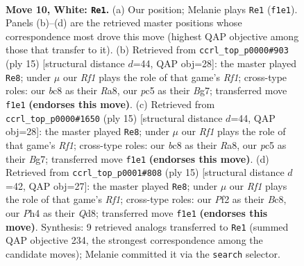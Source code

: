 \documentclass[11pt]{article}
\begin{document}
\clearpage

\begin{figure}[p]\centering
\begin{subfigure}{0.46\textwidth}\centering
\resizebox{\linewidth}{!}{%
\newchessgame
\chessboard[
  setfen={1rbq1rk1/pp1p1pbp/2n3p1/2p1p2n/2P4P/4PNP1/PP1P1PB1/RNBQ1RK1 w - - 0 10},
  showmover=false,
  pgfstyle=straightmove, color=movearrow, markmove={f1-e1}
]}
\caption{}
\end{subfigure}\hfill
\begin{subfigure}{0.46\textwidth}\centering
\resizebox{\linewidth}{!}{%
\newchessgame
\chessboard[
  setfen={rnbq1rk1/pp3pbp/3ppnp1/2pP4/2P5/2N2NP1/PP2PPBP/R1BQ1RK1 b - - 1 8},
  showmover=false,
  pgfstyle=straightmove, color=movearrow, markmove={f8-e8}
]}
\caption{}
\end{subfigure}
\\[4pt]
\begin{subfigure}{0.46\textwidth}\centering
\resizebox{\linewidth}{!}{%
\newchessgame
\chessboard[
  setfen={rnbq1rk1/pp3pbp/3ppnp1/2pP4/2P5/2N2NP1/PP2PPBP/R1BQ1RK1 b - - 1 8},
  showmover=false,
  pgfstyle=straightmove, color=movearrow, markmove={f8-e8}
]}
\caption{}
\end{subfigure}\hfill
\begin{subfigure}{0.46\textwidth}\centering
\resizebox{\linewidth}{!}{%
\newchessgame
\chessboard[
  setfen={r1bq1rk1/ppp2pbp/2nppnp1/8/2PP4/P1N2NP1/1P2PPBP/R1BQ1RK1 b - - 4 8},
  showmover=false,
  pgfstyle=straightmove, color=movearrow, markmove={f8-e8}
]}
\caption{}
\end{subfigure}
\caption{\textbf{Move 10, White: \texttt{Re1}.} (a) Our position; Melanie plays \texttt{Re1} (\texttt{f1e1}). Panels (b)--(d) are the retrieved master positions whose correspondence most drove this move (highest QAP objective among those that transfer to it). (b) Retrieved from \texttt{ccrl\_top\_p0000\#903} (ply 15) [structural distance $d$=44, QAP obj=28]: the master played \texttt{Re8}; under $\mu$ our \emph{Rf1} plays the role of that game's \emph{Rf1}; cross-type roles: our \emph{b}c8 as their \emph{R}a8, our \emph{p}c5 as their \emph{B}g7; transferred move \texttt{f1e1} \textbf{(endorses this move)}. (c) Retrieved from \texttt{ccrl\_top\_p0000\#1650} (ply 15) [structural distance $d$=44, QAP obj=28]: the master played \texttt{Re8}; under $\mu$ our \emph{Rf1} plays the role of that game's \emph{Rf1}; cross-type roles: our \emph{b}c8 as their \emph{R}a8, our \emph{p}c5 as their \emph{B}g7; transferred move \texttt{f1e1} \textbf{(endorses this move)}. (d) Retrieved from \texttt{ccrl\_top\_p0001\#808} (ply 15) [structural distance $d$=42, QAP obj=27]: the master played \texttt{Re8}; under $\mu$ our \emph{Rf1} plays the role of that game's \emph{Rf1}; cross-type roles: our \emph{P}f2 as their \emph{B}c8, our \emph{P}h4 as their \emph{Q}d8; transferred move \texttt{f1e1} \textbf{(endorses this move)}. Synthesis: 9 retrieved analogs transferred to \texttt{Re1} (summed QAP objective 234, the strongest correspondence among the candidate moves); Melanie committed it via the \texttt{search} selector.}
\label{fig:thought-m18}
\end{figure}
\end{document}
